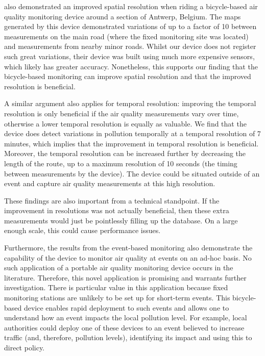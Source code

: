 \documentclass[11pt,twosided,a4paper]{report}
\begin{document}
\cite{Elen2013aeroflex} also demonstrated an improved spatial resolution when riding a bicycle-based air quality monitoring device around a section of Antwerp, Belgium. The maps generated by this device demonstrated variations of up to a factor of 10 between measurements on the main road (where the fixed monitoring site was located) and measurements from nearby minor roads. Whilst our device does not register such great variations, their device was built using much more expensive sensors, which likely has greater accuracy. Nonetheless, this supports our finding that the bicycle-based monitoring can improve spatial resolution and that the improved resolution is beneficial.

A similar argument also applies for temporal resolution: improving the temporal resolution is only beneficial if the air quality measurements vary over time, otherwise a lower temporal resolution is equally as valuable. We find that the device does detect variations in pollution temporally at a temporal resolution of 7 minutes, which implies that the improvement in temporal resolution is beneficial. Moreover, the temporal resolution can be increased further by decreasing the length of the route, up to a maximum resolution of 10 seconds (the timing between measurements by the device). The device could be situated outside of an event and capture air quality measurements at this high resolution.

These findings are also important from a technical standpoint. If the improvement in resolutions was not actually beneficial, then these extra measurements would just be pointlessly filling up the database. On a large enough scale, this could cause performance issues.

Furthermore, the results from the event-based monitoring also demonstrate the capability of the device to monitor air quality at events on an ad-hoc basis. No such application of a portable air quality monitoring device occurs in the literature. Therefore, this novel application is promising and warrants further investigation. There is particular value in this application because fixed monitoring stations are unlikely to be set up for short-term events. This bicycle-based device enables rapid deployment to such events and allows one to understand how an event impacts the local pollution level. For example, local authorities could deploy one of these devices to an event believed to increase traffic (and, therefore, pollution levels), identifying its impact and using this to direct policy.
\end{document}
